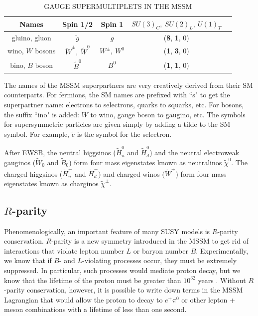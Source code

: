 \begin{table}[ht]
    \caption{GAUGE SUPERMULTIPLETS IN THE MSSM}
    \centering
    \begin{tabular}{|c|c|c|c|c|}
    \hline
    \hline
    Names & Spin 1/2 & Spin 1 &$SU(3)_C,~SU(2)_L,~U(1)_\Upsilon $\\
  	  \hline
           \hline    
gluino, gluon & $\tilde{g}$ & $g$   & (\textbf{8}, \textbf{1}, 0) \\
\hline
wino, $W$ bosons & $\widetilde{W}^\pm,~\widetilde{W}^0$ & $W^\pm,~W^0$ & (\textbf{1}, \textbf{3}, 0) \\
\hline
bino, $B$ boson & $\widetilde{B}^0$ & $B^0$ & (\textbf{1}, \textbf{1}, 0) \\
           \hline
           \hline
    \end{tabular}
    \label{tab:SUSY_bosons}
\end{table}

The names of the MSSM superpartners are very creatively derived from their SM counterparts. For fermions, the SM names are prefixed with ``s" to get the superpartner name: electrons to selectrons, quarks to squarks, etc. For bosons, the suffix ``ino" is added: $W$ to wino, gauge boson to gaugino, etc. The symbols for supersymmetric particles are given simply by adding a tilde to the SM symbol. For example, $\tilde{e}$ is the symbol for the selectron.

After EWSB, the neutral higgsinos ($\widetilde{H}_u^0$ and $\widetilde{H}_d^0$) and the neutral electroweak gauginos ($\widetilde{W}_0$ and $\widetilde{B}_0$) form four mass eigenstates known as neutralinos $\widetilde{\chi}^0$. The charged higgsinos ($\widetilde{H}_u^+$ and $\widetilde{H}_d^-$) and charged winos ($\widetilde{W}^\pm$) form four mass eigenstates known as charginos $\widetilde{\chi}^\pm$. 



\subsection{$R$-parity}
\label{sec:Rparity}
Phenomenologically, an important feature of many SUSY models is $R$-parity conservation.
$R$-parity is a new symmetry introduced in the MSSM to get rid of interactions that violate lepton number $L$
or baryon number $B$. 
Experimentally, we know that if $B$- and $L$-violating processes occur, they must be extremely suppressed. 
In particular, such processes would mediate proton decay, but we know that the 
lifetime of the proton must be greater than $10^{32}$ years \cite{SUSYprimer}. 
Without $R$-parity conservation, however, it is possible to write down terms in the MSSM Lagrangian 
that would allow the proton to decay to $e^+\pi^0$ or other 
lepton + meson combinations with a lifetime of less than one second.

